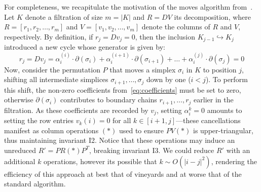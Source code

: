 \documentclass[sn-mathphys]{sn-jnl}
\begin{document}
For completeness, we recapitulate the motivation of the moves algorithm from~\cite{busaryev2010tracking}. 
Let $K$ denote a filtration of size $m = \lvert K \rvert$ and $R = DV$ its decomposition, where $R = [r_1, r_2, \dots, r_m]$ and $V = [v_1, v_2, \dots, v_m]$ denote the columns of $R$ and $V$, respectively. By definition, if $r_j = D v_j = 0$, then the inclusion $K_{j-1} \hookrightarrow K_{j}$ introduced a new cycle whose generator is given by:
\begin{equation}\label{eq:coefficients}
	r_j = D v_j = \alpha_i^{(i)} \cdot \partial(\sigma_{i}) + \alpha_{i}^{(i+1)} \cdot \partial(\sigma_{i+1}) + \dots + \alpha_{i}^{(j)} \cdot \partial(\sigma_{j}) = 0
\end{equation}
Now, consider the permutation $P$ that moves a simplex $\sigma_i$ in $K$ to position $j$, shifting all intermediate simplices $\sigma_{i+1}, \dots, \sigma_{j}$ down by one ($i < j$). 
To perform this shift, the non-zero coefficients from~\eqref{eq:coefficients} must be set to zero, otherwise $\partial(\sigma_i)$ contributes to boundary chains $r_{i+1}, \dots, r_j$ earlier in the filtration. 
As these coefficients are recorded by $v_j$, setting $\alpha_i^k = 0$  amounts to setting the row entries $v_k(i) = 0$ for all $k \in [i+1,j]$---these cancellations manifest as column operations $(\ast)$ used to ensure $PV(\ast)$ is upper-triangular, thus maintaining invariant I2.
Notice that these operations may induce an unreduced $R' = P R(\ast) P^T$, breaking invariant I3.
We could reduce $R'$ with an additional $k$ operations, however its possible that $k \sim O(\lvert i - j\rvert^2)$, rendering the efficiency of this approach at best that of vineyards and at worse that of the standard algorithm. 
\end{document}

